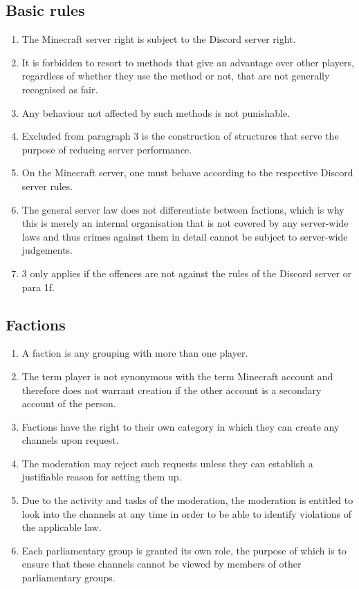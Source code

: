 \documentclass{article}
\begin{document}
\subsection{Basic rules}
\begin{enumerate}[(1)]
	\item The Minecraft server right is subject to the Discord server right.
	\item It is forbidden to resort to methods that give an advantage over other players, regardless of whether they use the method or not, that are not generally recognised as fair.
	\item Any behaviour not affected by such methods is not punishable.
	\item Excluded from paragraph 3 is the construction of structures that serve the purpose of reducing server performance.
	\item On the Minecraft server, one must behave according to the respective Discord server rules.
	\item The general server law does not differentiate between factions, which is why this is merely an internal organisation that is not covered by any server-wide laws and thus crimes against them in detail cannot be subject to server-wide judgements.
	\item 3 only applies if the offences are not against the rules of the Discord server or para 1f.
\end{enumerate}

\subsection{Factions}
\begin{enumerate}[(1)]
    \item A faction is any grouping with more than one player.
	\item The term player is not synonymous with the term Minecraft account and therefore does not warrant creation if the other account is a secondary account of the person.
	\item Factions have the right to their own category in which they can create any channels upon request.
	\item The moderation may reject such requests unless they can establish a justifiable reason for setting them up.
	\item Due to the activity and tasks of the moderation, the moderation is entitled to look into the channels at any time in order to be able to identify violations of the applicable law.
	\item Each parliamentary group is granted its own role, the purpose of which is to ensure that these channels cannot be viewed by members of other parliamentary groups.
\end{enumerate}
\end{document}
